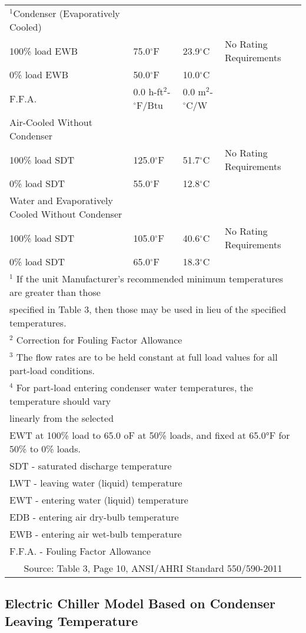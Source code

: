 \begin{longtable}[c]{p{1.2in}p{1.2in}p{1.2in}p{1.2in}p{1.2in}}
\(^{1}\)Condenser (Evaporatively Cooled) & & & & \tabularnewline
100\% load EWB & 75.0\(^{\circ}\)F & 23.9\(^{\circ}\)C & \multicolumn{2}{l}{No Rating Requirements} \tabularnewline
0\% load EWB & 50.0\(^{\circ}\)F & 10.0\(^{\circ}\)C & & \tabularnewline
F.F.A. & 0.0 h-ft\(^{2}\)-\(^{\circ}\)F/Btu & 0.0 m\(^{2}\)-\(^{\circ}\)C/W & & \tabularnewline
\midrule
Air-Cooled Without  Condenser & & & & \tabularnewline
100\% load SDT & 125.0\(^{\circ}\)F & 51.7\(^{\circ}\)C & \multicolumn{2}{l}{No Rating Requirements} \tabularnewline
0\% load SDT & 55.0\(^{\circ}\)F & 12.8\(^{\circ}\)C & & \tabularnewline
\midrule
Water and Evaporatively Cooled Without Condenser & & & & \tabularnewline
100\% load SDT & 105.0\(^{\circ}\)F & 40.6\(^{\circ}\)C & \multicolumn{2}{l}{No Rating Requirements} \tabularnewline
0\% load SDT & 65.0\(^{\circ}\)F & 18.3\(^{\circ}\)C & & \tabularnewline
\bottomrule
\multicolumn{5}{l}{\(^{1}\) If the unit Manufacturer’s recommended minimum temperatures are greater than those} \tabularnewline
\multicolumn{5}{l}{specified in Table 3, then those may be used in lieu of the specified temperatures.} \tabularnewline
\multicolumn{5}{l}{\(^{2}\) Correction for Fouling Factor Allowance} \tabularnewline
\multicolumn{5}{l}{\(^{3}\) The flow rates are to be held constant at full load values for all part-load conditions.} \tabularnewline
\multicolumn{5}{l}{\(^{4}\) For part-load entering condenser water temperatures, the temperature should vary} \tabularnewline
\multicolumn{5}{l}{linearly from the selected} \tabularnewline
\multicolumn{5}{l}{EWT at 100\% load to 65.0 oF at 50\% loads, and fixed at 65.0°F for 50\% to 0\% loads.} \tabularnewline
\multicolumn{5}{l}{SDT - saturated discharge temperature} \tabularnewline
\multicolumn{5}{l}{LWT - leaving water (liquid) temperature} \tabularnewline
\multicolumn{5}{l}{EWT - entering water (liquid) temperature} \tabularnewline
\multicolumn{5}{l}{EDB - entering air dry-bulb temperature} \tabularnewline
\multicolumn{5}{l}{EWB - entering air wet-bulb temperature} \tabularnewline
\multicolumn{5}{l}{F.F.A. - Fouling Factor Allowance} \tabularnewline
\multicolumn{5}{c}{\scriptsize Source: Table 3, Page 10, ANSI/AHRI Standard 550/590-2011}
\end{longtable}

\subsection{Electric Chiller Model Based on Condenser Leaving Temperature}\label{electric-chiller-model-based-on-condenser-leaving-temperature}

